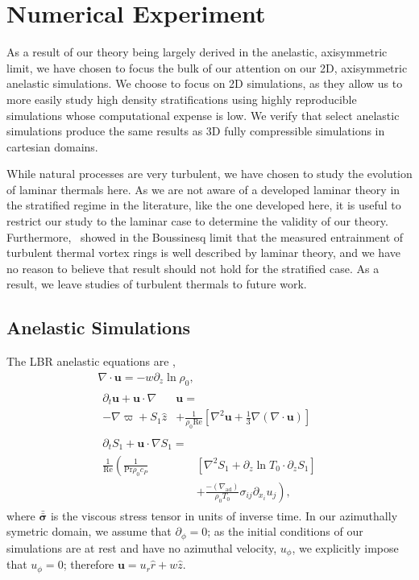 \documentclass[twocolumn, amsmath, amsfonts, amssymb, trackchanges]{aastex62}
\newcommand{\DivU}{\ensuremath{\nabla\cdot\bm{u}}}
\newcommand{\grad}{\ensuremath{\nabla}}
\newcommand{\lilstressT}{\ensuremath{\bm{\bar{\bar{\sigma}}}}}
\newcommand{\LJ}{\citetalias{lecoanet&jeevanjee2018}}
\begin{document}
\section{Numerical Experiment} 
\label{sec:experiment}
As a result of our theory being largely derived in the anelastic, axisymmetric limit, we have chosen to focus the bulk of our attention on our 2D, axisymmetric anelastic simulations.
We choose to focus on 2D simulations, as they allow us to more easily study high density stratifications using highly reproducible simulations whose computational expense is low.
We verify that select anelastic simulations produce the same results as 3D fully compressible simulations in cartesian domains. 

While natural processes are very turbulent, we have chosen to study the evolution of laminar thermals here. 
As we are not aware of a developed laminar theory in the stratified regime in the literature, like the one developed here, it is useful to restrict our study to the laminar case to determine the validity of our theory.
Furthermore, \LJ\, showed in the Boussinesq limit that the measured entrainment of turbulent thermal vortex rings is well described by laminar theory, and we have no reason to believe that result should not hold for the stratified case.
As a result, we leave studies of turbulent thermals to future work.

\subsection{Anelastic Simulations}
The LBR anelastic equations are \citep{lecoanet&all2014},
\begin{gather}
\DivU = -w \partial_z \ln\rho_0, \\
\begin{split}
\partial_t \bm{u} + \bm{u}\cdot\grad&\bm{u} = \\
- \grad \varpi + S_1\hat{z} &
+ \frac{1}{\rho_0\text{Re}}\left[\grad^2 \bm{u} + \frac{1}{3}\grad(\DivU)\right] 
\end{split}\\
\begin{split}
\partial_t S_1 + \bm{u}\cdot\grad S_1 =& \\
\frac{1}{\text{Re}}\left(\frac{1}{\text{Pr}\rho_0c_P }\right.&[\grad^2 S_1 + \partial_z\ln T_0 \cdot\partial_z S_1]\\
&+ \left.\frac{-(\grad_{\text{ad}})}{\rho_0 T_0}\sigma_{ij}\partial_{x_i}u_j \right),
\end{split}
\end{gather}
where $\lilstressT$ is the viscous stress tensor in units of inverse time.
In our azimuthally symetric domain, we assume that $\partial_\phi = 0$; as the initial conditions of our simulations are at rest and have no azimuthal velocity, $u_\phi$, we explicitly impose that $u_\phi = 0$; therefore $\bm{u} = u_r \hat{r} + w\hat{z}$. 
\end{document}
